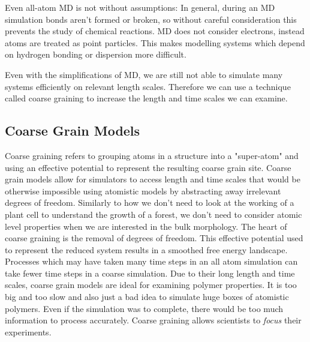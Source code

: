 Even all-atom MD is not without assumptions:
In general, during an MD simulation bonds aren't formed or broken, so without careful consideration this prevents the study of chemical reactions.
MD does not consider electrons, instead atoms are treated as point particles. 
This makes modelling systems which depend on hydrogen bonding or dispersion more difficult.

Even with the simplifications of MD, we are still not able to simulate many systems efficiently on relevant length scales.
Therefore we can use a technique called coarse graining to increase the length and time scales we can examine.

\subsection*{Coarse Grain Models}

Coarse graining refers to grouping atoms in a structure into a "super-atom" and using an effective potential to represent the resulting coarse grain site.
Coarse grain models allow for simulators to access length and time scales that would be otherwise impossible using atomistic models by abstracting away irrelevant degrees of freedom.
Similarly to how we don't need to look at the working of a plant cell to understand the growth of a forest, we don't need to consider atomic level properties when we are interested in the bulk morphology\cite{Muller-Plathe2002}.
The heart of coarse graining is the removal of degrees of freedom. 
This effective potential used to represent the reduced system results in a smoothed free energy landscape. 
Processes which may have taken many time steps in an all atom simulation can take fewer time steps in a coarse simulation\cite{Berendsen2010}.
Due to their long length and time scales, coarse grain models are ideal for examining polymer properties\cite{Gartner2019a}.
It is too big and too slow and also just a bad idea to simulate huge boxes of atomistic polymers.
Even if the simulation was to complete, there would be too much information to process accurately. 
Coarse graining allows scientists to \textit{focus} their experiments\cite{Baschnagel2000}.

